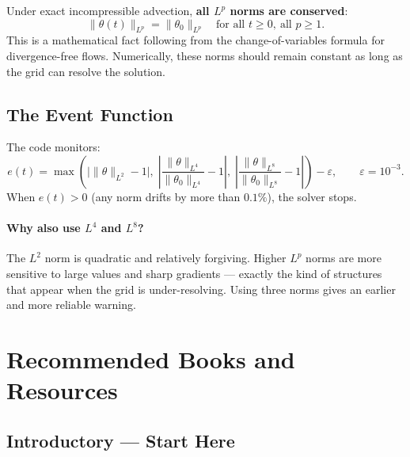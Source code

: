 \documentclass[12pt,a4paper]{article}
\theoremstyle{definition}
\begin{document}
Under exact incompressible advection, \textbf{all $L^p$ norms are conserved}:
\[
  \|\theta(t)\|_{L^p} = \|\theta_0\|_{L^p}
  \quad \text{for all } t\geq 0,\ \text{all } p\geq 1.
\]
This is a mathematical fact following from the change-of-variables formula for
divergence-free flows.  Numerically, these norms should remain constant as long
as the grid can resolve the solution.

\subsection{The Event Function}

The code monitors:
\begin{equation}
  e(t) = \max\!\left(
    \bigl|\|\theta\|_{L^2}-1\bigr|,\;
    \left|\frac{\|\theta\|_{L^4}}{\|\theta_0\|_{L^4}}-1\right|,\;
    \left|\frac{\|\theta\|_{L^8}}{\|\theta_0\|_{L^8}}-1\right|
  \right) - \varepsilon,
  \qquad \varepsilon = 10^{-3}.
\end{equation}
When $e(t) > 0$ (any norm drifts by more than $0.1\%$), the solver stops.

\paragraph{Why also use $L^4$ and $L^8$?}
The $L^2$ norm is quadratic and relatively forgiving.  Higher $L^p$ norms are
more sensitive to large values and sharp gradients — exactly the kind of
structures that appear when the grid is under-resolving.  Using three norms
gives an earlier and more reliable warning.

\section{Recommended Books and Resources}

\subsection*{Introductory — Start Here}
\end{document}
